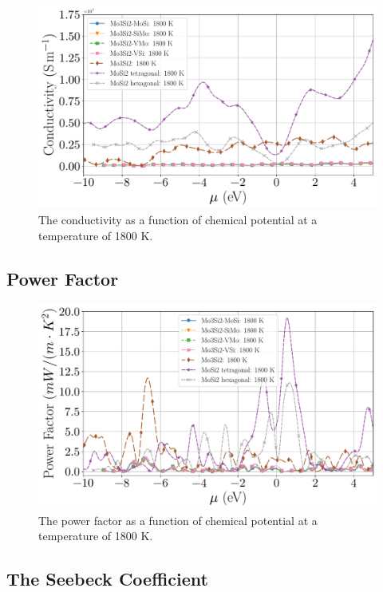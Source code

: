 \documentclass[7.5pt]{article}
\theoremstyle{plain}
\theoremstyle{definition}
\newcommand{\<}{\langle}
\renewcommand{\>}{\rangle}
\begin{document}
\begin{figure}[b!]
\centering
  \includegraphics[width=\linewidth]{allmats_C_mu_temp_p}
\caption{The conductivity as a function of chemical potential at a temperature of 1800 K.}
\label{fig:C-mu}
\end{figure}


\pagebreak
\clearpage
\subsection{Power Factor}

\begin{figure}[b!]
\centering
\includegraphics[width=\linewidth]{allmats_Po_mu_temp_p}
\caption{The power factor as a function of chemical potential at a temperature of 1800 K.}
\label{fig:Po-mu}
\end{figure}


\pagebreak
\clearpage
\subsection{The Seebeck Coefficient}
\end{document}
